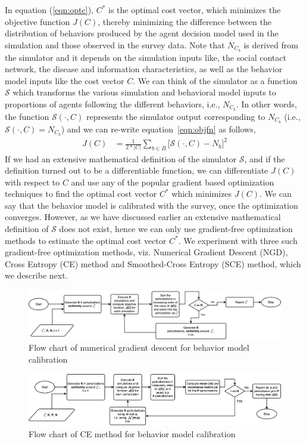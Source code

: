 \documentclass[doublespace]{VTthesis}
\begin{document}
    In equation (\ref{eqn:optc}), $C^*$ is the optimal cost vector, which minimizes the objective function $J(C)$, thereby minimizing the difference between the distribution of behaviors produced by the agent decision model used in the simulation and those observed in the survey data. Note that $N_{C_b}$ is derived from the simulator and it depends on the simulation inputs like, the social contact network, the disease and information characteristics, as well as the behavior model inputs like the cost vector $C$. We can think of the simulator as a function $\mathscr{S}$ which transforms the various simulation and behavioral model inputs to proportions of agents following the different behaviors, i.e., $N_{C_b}$. In other words, the function $\mathscr{S}(\cdot, C)$ represents the simulator output corresponding to $N_{C_b}$ (i.e., $\mathscr{S}(\cdot, C) = N_{C_b}$) and we can re-write equation~\ref{eqn:objfn} as follows,
    \begin{align}
        J(C) &= \frac{1}{2 * |C|} \sum_{b \in B}\bigg[ \mathscr{S}(\cdot, C) - N_{b} \bigg]^2
    	\label{eqn:objfn2}
    \end{align}
    If we had an extensive mathematical definition of the simulator $\mathscr{S}$, and if the definition turned out to be a differentiable function, we can differentiate $J(C)$ with respect to $C$ and use any of the popular gradient based optimization techniques to find the optimal cost vector $C^*$ which minimizes $J(C)$. We can say that the behavior model is calibrated with the survey, once the optimization converges. However, as we have discussed earlier an extensive mathematical definition of $\mathscr{S}$ does not exist, hence we can only use gradient-free optimization methods to estimate the optimal cost vector $C^*$. We experiment with three such gradient-free optimization methods, viz. Numerical Gradient Descent (NGD), Cross Entropy (CE) method and Smoothed-Cross Entropy (SCE) method, which we describe next. 
    \begin{figure}[H]
    \centering
    \includegraphics[width=\textwidth]{figures/ngd.pdf}
    \caption{Flow chart of numerical gradient descent for behavior model calibration}
    \label{fig:ngd}
    \end{figure}
    \begin{figure}[H]
    \centering
    \includegraphics[width=\textwidth]{figures/cem.pdf}
    \caption{Flow chart of CE method for behavior model calibration}
    \label{fig:cem}
    \end{figure}
\end{document}
